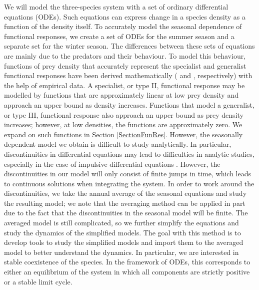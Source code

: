 \documentclass[12pt]{UOthesis}
\theoremstyle{remarkstyle}
\begin{document}
We will model the three-species system with a set of ordinary differential equations (ODEs). Such equations can express change in a species density as a function of the density itself. To accurately model the seasonal dependence of functional responses, we create a set of ODEs for the summer season and a separate set for the winter season. The differences between these sets of equations are mainly due to the predators and their behaviour. To model this behaviour, functions of prey density that accurately represent the specialist and generalist functional responses have been derived mathematically (\cite{Holling1} and \cite{Real}, respectively) with the help of empirical data. A specialist, or type II, functional response may be modelled by functions that are approximately linear at low prey density and approach an upper bound as density increases. Functions that model a generalist, or type III, functional response also approach an upper bound as prey density increases; however, at low densities, the functions are approximately zero. We expand on such functions in Section \ref{SectionFunRes}. However, the seasonally dependent model we obtain is difficult to study analytically. In particular, discontinuities in differential equations may lead to difficulties in analytic studies, especially in the case of impulsive differential equations \cite{BainovSimeonov}. However, the discontinuities in our model will only consist of finite jumps in time, which leads to continuous solutions when integrating the system. In order to work around the discontinuities, we take the annual average of the seasonal equations and study the resulting model; we note that the averaging method can be applied in part due to the fact that the discontinuities in the seasonal model will be finite. The averaged model is still complicated, so we further simplify the equations and study the dynamics of the simplified models. The goal with this method is to develop tools to study the simplified models and import them to the averaged model to better understand the dynamics. In particular, we are interested in stable coexistence of the species. In the framework of ODEs, this corresponds to either an equilibrium of the system in which all components are strictly positive or a stable limit cycle.\\
\end{document}
